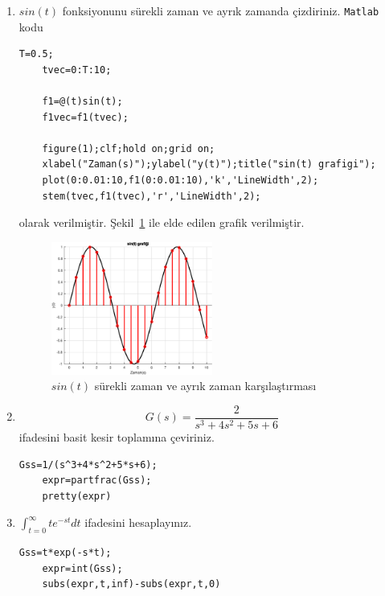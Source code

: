 \begin{enumerate}
\begin{equation}
\begin{split}
                \frac{1}{s}\right\}
                -\frac{1}{2}\mathcal{L}^{-1}\left\{\frac{1}{s+1}\right\}
                +\frac{1}{6}\mathcal{L}^{-1}\left\{\frac{1}{s+3}
            \right\}\\
            y(t)&=\frac{1}{3}\left\{1\right\}-\frac{1}{2}\left\{e^{-t}\right\}+\frac{1}{6}\left\{e^{-3t}
            \right\}\\
            y(t)&=\frac{1}{3}-\frac{1}{2}\left\{e^{-t}\right\}+\frac{1}{6}\left\{e^{-3t}
            \right\}
        \end{split}
    \end{equation}
    elde edilir. 
    
    \item $sin(t)$ fonksiyonunu sürekli zaman ve ayrık zamanda çizdiriniz.
    \verb|Matlab| kodu
    \begin{lstlisting}[style=Matlab-editor]
    T=0.5;
    tvec=0:T:10;

    f1=@(t)sin(t);
    f1vec=f1(tvec);

    figure(1);clf;hold on;grid on;
    xlabel("Zaman(s)");ylabel("y(t)");title("sin(t) grafigi");
    plot(0:0.01:10,f1(0:0.01:10),'k','LineWidth',2);
    stem(tvec,f1(tvec),'r','LineWidth',2);
    \end{lstlisting}
    olarak verilmiştir. Şekil~\ref{fig:lec1_plot1} ile elde edilen grafik verilmiştir.
    \begin{figure}[!htb]
        \centering
        \includegraphics[width=0.5\textwidth]{img/lec1_plot1}
        \caption{$sin(t)$ sürekli zaman ve ayrık zaman karşılaştırması}
        \label{fig:lec1_plot1}
    \end{figure}
    
    \item 
    \begin{equation}
        G(s)=\frac{2}{s^3+4s^2+5s+6}
    \end{equation}
    ifadesini basit kesir toplamına çeviriniz.
    \begin{lstlisting}[style=Matlab-editor]
    Gss=1/(s^3+4*s^2+5*s+6);
    expr=partfrac(Gss);
    pretty(expr)
    \end{lstlisting}
    \item $\int_{t=0}^{\infty} te^{-st}dt$ ifadesini hesaplayınız.
    \begin{lstlisting}[style=Matlab-editor]
    Gss=t*exp(-s*t);
    expr=int(Gss);
    subs(expr,t,inf)-subs(expr,t,0)
    \end{lstlisting}
\end{enumerate}